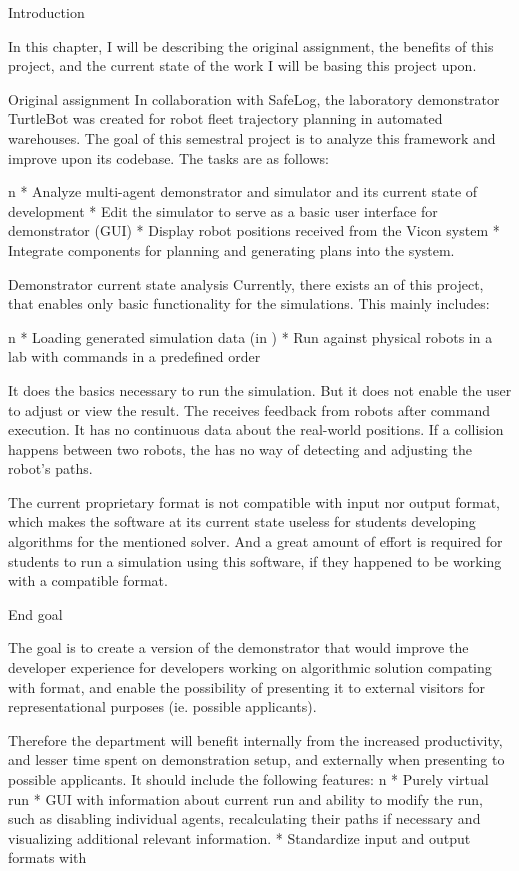 \chap Introduction

In this chapter, I will be describing the original assignment, the benefits of this project, and the current state of the work I will be basing this project upon.

\sec Original assignment
In collaboration with SafeLog, the laboratory demonstrator TurtleBot was created for robot fleet trajectory planning in automated warehouses. The goal of this semestral project is to analyze this framework and improve upon its codebase. The tasks are as follows:

\begitems \style n
    * Analyze multi-agent demonstrator and simulator {\mapfIR} and its current state of development 
    * Edit the simulator to serve as a basic user interface for demonstrator (GUI)
    * Display robot positions received from the Vicon system
    * Integrate components for planning and generating plans into the system.
\enditems

\sec Demonstrator current state analysis
Currently, there exists an {\oldRepo} of this project, that enables only basic functionality for the simulations. This mainly includes:

\begitems \style n
    * Loading generated simulation data (in {\oldFormat})
    * Run against physical robots in a lab with commands in a predefined order
\enditems

It does the basics necessary to run the simulation. But it does not enable the user to adjust or view the result. The {\oldRepo} receives feedback from robots after command execution. It has no continuous data about the real-world positions. If a collision happens between two robots, the {\oldRepo} has no way of detecting and adjusting the robot's paths.

The current proprietary format is not compatible with {\mapfIR} input nor output format, which makes the software at its current state useless for students developing algorithms for the mentioned solver. And a great amount of effort is required for students to run a simulation using this software, if they happened to be working with a compatible format.

\sec End goal

The goal is to create a version of the demonstrator that would improve the developer experience for developers working on algorithmic solution compating with {\mapfIR} format, and enable the possibility of presenting it to external visitors for representational purposes (ie. possible applicants).

Therefore the department will benefit internally from the increased productivity, and lesser time spent on demonstration setup, and externally when presenting to possible applicants.
It should include the following features:
\begitems \style n
    * Purely virtual run
    * GUI with information about current run and ability to modify the run, such as disabling individual agents, recalculating their paths if necessary and visualizing additional relevant information.
    * Standardize input and output formats with \mapfIR
\enditems